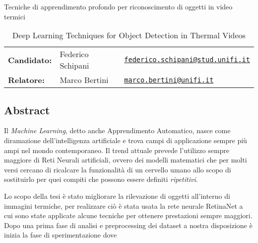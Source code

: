\documentclass[11pt]{article}
\begin{document}
\begin{table}[]
\centering
\caption*{Tecniche di apprendimento profondo per riconoscimento di oggetti in video termici}
\caption*{Deep Learning Techniques for Object Detection in Thermal Videos}
\begin{tabular}{lll}
\textbf{Candidato:}   & Federico Schipani & \href{mailto:federico.schipani@stud.unifi.it}{\texttt{federico.schipani@stud.unifi.it}}  \\
\textbf{Relatore:}    & Marco Bertini  & \href{mailto:marco.bertini@unifi.it}{\texttt{marco.bertini@unifi.it}}                           \\
\end{tabular}
\end{table}
\subsection*{Abstract}
Il \textit{Machine Learning}, detto anche Apprendimento Automatico, nasce come diramazione dell'intelligenza artificiale e trova  campi di applicazione sempre più ampi nel mondo contemporaneo. Il trend attuale prevede l'utilizzo sempre maggiore di Reti Neurali artificiali, ovvero dei modelli matematici che per molti versi cercano di ricalcare la funzionalità di un cervello umano allo scopo di sostituirlo per quei compiti che possono essere definiti \textit{ripetitivi}. 

Lo scopo della tesi è stato migliorare la rilevazione di oggetti all'interno di immagini termiche, per realizzare ciò è stata usata la rete neurale RetinaNet a cui sono state applicate alcune tecniche per ottenere prestazioni sempre maggiori. Dopo una prima fase di analisi e preprocessing dei dataset a nostra disposizione è inizia la fase di sperimentazione dove 
\end{document}
